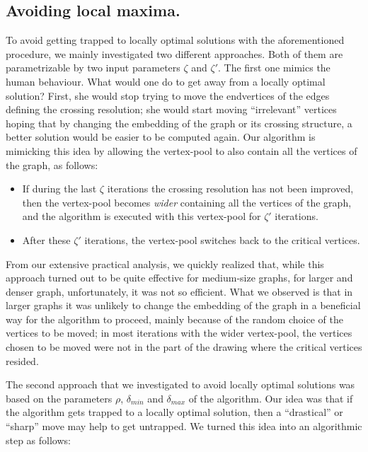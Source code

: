 \documentclass[runningheads]{llncs}
\begin{document}
\subsection{Avoiding local maxima.}
\label{ssec:maxima}

To avoid getting trapped to locally optimal solutions with the aforementioned procedure, we mainly investigated two different approaches. Both of them are parametrizable by two input parameters $\zeta$ and $\zeta'$. The first one mimics the human behaviour. What would one do to get away from a locally optimal solution? First, she would stop trying to move the endvertices of the edges defining the crossing resolution; she would start moving ``irrelevant'' vertices hoping that by changing the embedding of the graph or its crossing structure, a better solution would be easier to be computed again. Our algorithm is mimicking this idea by allowing the vertex-pool to also contain all the vertices of the graph, as follows: 

\begin{itemize}
\item If during the last $\zeta$ iterations the crossing resolution has not been improved, then the vertex-pool becomes \emph{wider} containing all the vertices of the graph, and the algorithm is executed with this vertex-pool for $\zeta'$ iterations. 
\item After these $\zeta'$ iterations, the vertex-pool switches back to the critical vertices.
\end{itemize}
%
From our extensive practical analysis, we quickly realized that, while this approach turned out to be quite effective for medium-size graphs, for larger and denser graph, unfortunately, it was not so efficient. What we observed is that in larger graphs it was unlikely to change the embedding of the graph in a beneficial way for the algorithm to proceed, mainly because of the random choice of the vertices to be moved; in most iterations with the wider vertex-pool, the vertices chosen to be moved were not in the part of the drawing where the critical vertices resided.

The second approach that we investigated to avoid locally optimal solutions was based on the parameters $\rho$, $\delta_{min}$ and $\delta_{max}$ of the algorithm. Our idea was that if the algorithm gets trapped to a locally optimal solution, then a ``drastical'' or ``sharp'' move may help to get untrapped. We turned this idea into an algorithmic step as follows: 
\end{document}
